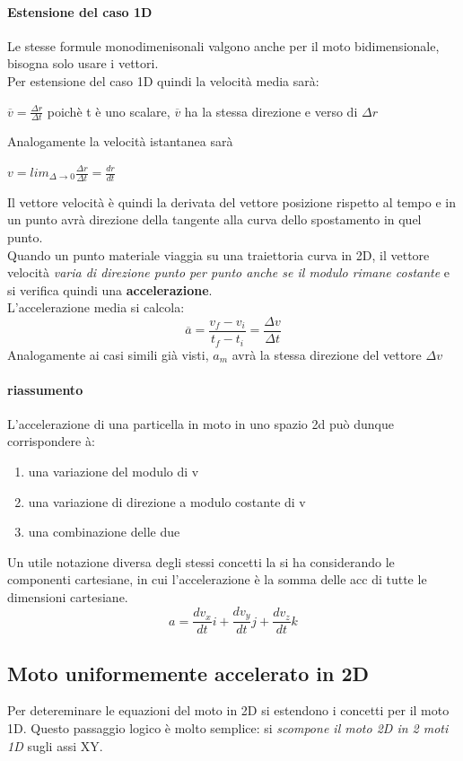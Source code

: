 \documentclass[12pt, a4paper, openany]{book}
\begin{document}
\paragraph*{Estensione del caso 1D} Le stesse formule monodimenisonali valgono anche per il moto bidimensionale, bisogna solo usare i vettori.
\\Per estensione del caso 1D quindi la velocità media sarà:
\begin{center}
    $\overline{v} = \frac{\Delta r}{\Delta t}$ poichè t è uno scalare, $\overline{v}$ ha la stessa direzione e verso di $\Delta r$
\end{center}
Analogamente la velocità istantanea sarà
\begin{center}
    $v = lim_{\Delta \to 0 } \frac{\Delta r}{\Delta t} = \frac{dr}{dt}$
\end{center}
Il vettore velocità è quindi la derivata del vettore posizione rispetto al tempo e in un punto avrà direzione della tangente
alla curva dello spostamento in quel punto.
\\Quando un punto materiale viaggia su una traiettoria curva in 2D, il vettore velocità \emph{varia di direzione punto per punto anche se il modulo rimane costante} e si verifica quindi una \textbf{accelerazione}.
\\L'accelerazione media si calcola:
\[\overline{a}=\frac{v_f-v_i}{t_f-t_i}= \frac{\Delta v}{\Delta t}\]
Analogamente ai casi simili già visti, $a_m$ avrà la stessa direzione del vettore $\Delta v$
\paragraph*{riassumento}L'accelerazione di una particella in moto in uno spazio 2d può dunque corrispondere à:
\begin{enumerate}
    \item una variazione del modulo di v
    \item una variazione di direzione a modulo costante di v
    \item una combinazione delle due
\end{enumerate}
Un utile notazione diversa degli stessi concetti la si ha considerando le componenti cartesiane, in cui l'accelerazione è la somma delle acc di tutte le dimensioni cartesiane.
$$ a = \frac{dv_x}{dt}i + \frac{dv_y}{dt}j + \frac{dv_z}{dt}k $$
\subsection{Moto uniformemente accelerato in 2D}
Per detereminare le equazioni del moto in 2D si estendono i concetti per il moto 1D.
Questo passaggio logico è molto semplice: si \emph{scompone il moto 2D in 2 moti 1D} sugli assi XY.
\end{document}
